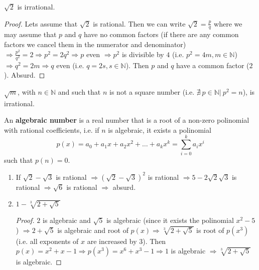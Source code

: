 \documentclass[12pt, a4paper]{book}
\begin{document}
\begin{exmp}
  $\sqrt{2}$ is irrational.
  \begin{proof}
    Lets assume that $\sqrt{2}$ is rational. Then we can write $\displaystyle\sqrt{2} = \frac{p}{q}$ where we may assume that $p$ and $q$ have no common factors (if there are any common factors we cancel them in the numerator and denominator) $\Rightarrow \frac{p^2}{q^2} = 2 \Rightarrow p^2 = 2 q^2 \Rightarrow p$ even $\Rightarrow p^2$ is divisible by $4$ (i.e. $p^2=4m, m\in\mathbb{N}$) $\Rightarrow q^2 = 2m \Rightarrow q$ even (i.e. $q = 2s, s\in\mathbb{N}$). Then $p$ and $q$ have a common factor ($2$). Absurd.
  \end{proof}
\end{exmp}

\begin{prop}
  $\sqrt{m}$, with $n\in\mathbb{N}$ and such that $n$ is not a square number (i.e. $\nexists\ p\in\mathbb{N} \vert\ p^2 = n$), is irrational.
\end{prop}

\begin{defn}
  An \textbf{algebraic number} is a real number that is a root of a non-zero polinomial with rational coefficients, i.e. if $n$ is algebraic, it exists a polinomial
  \[
    \displaystyle p(x) = a_0 + a_1 x + a_2 x^2 + \ldots + a_k x^k = \sum_{i = 0}^{k}a_i x^i  
  \]
  such that $p(n)=0$.
\end{defn}

\begin{exmp}
  \begin{enumerate}[label=\emph{\alph*})]
    \item If $\sqrt{2} - \sqrt{3}$ is rational $\Rightarrow {(\sqrt{2} - \sqrt{3})}^2$ is rational $\Rightarrow 5 - 2\sqrt{2}\sqrt{3}$ is rational $\Rightarrow \sqrt{6}$ is rational $\Rightarrow$ absurd.
    \item $\displaystyle 1 - \sqrt[3]{2+\sqrt{5}}$
    
    \begin{proof}
      $2$ is algebraic and $\sqrt{5}$ is algebraic (since it exists the polinomial $x^2-5$) $\Rightarrow 2+\sqrt{5}$ is algebraic and root of $p(x) \Rightarrow \sqrt[3]{2+\sqrt{5}}$ is root of $p(x^3)$ (i.e. all exponents of $x$ are increased by $3$). Then $p(x)=x^2+x-1 \Rightarrow p(x^3) = x^6 +x^3 -1 \Rightarrow 1$ is algebraic $\Rightarrow \sqrt[3]{2+\sqrt{5}}$ is algebraic.
    \end{proof}
  \end{enumerate}
\end{exmp}
\end{document}

